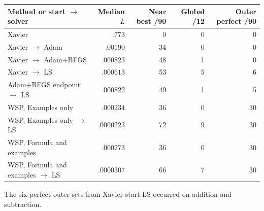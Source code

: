 \begin{center}
\begin{minipage}{\linewidth}
\centering
\makeatletter{}\makeatother
\caption{Training loss and exact outer predictions for the matched optimizer study. Near best and outer perfect use all 90 configurations. Global uses the 12 one-hinge fits with certified real minima.}\label{tab:loss_audit}
\small\setlength{\tabcolsep}{4pt}
\begin{tabular}{@{}lrrrr@{}}\toprule
Method or start $\to$ solver & Median $L$ & Near best /90 & Global /12 & Outer perfect /90\\\midrule
Xavier & $.773$ & 0 & 0 & 0\\
Xavier $\to$ Adam & $.00190$ & 34 & 0 & 0\\
Xavier $\to$ Adam+BFGS & $.000823$ & 48 & 1 & 0\\
Xavier $\to$ LS & $.000613$ & 53 & 5 & 6\\
Adam+BFGS endpoint $\to$ LS & $.000822$ & 49 & 1 & 5\\
WSP, Examples only & $.000234$ & 36 & 0 & 30\\
WSP, Examples only $\to$ LS & $.0000223$ & 72 & 9 & 30\\
WSP, Formula and examples & $.000273$ & 36 & 0 & 30\\
WSP, Formula and examples $\to$ LS & $.0000307$ & 66 & 7 & 30\\\bottomrule
\end{tabular}
\end{minipage}
\end{center}
The six perfect outer sets from Xavier-start LS occurred on addition and subtraction.

